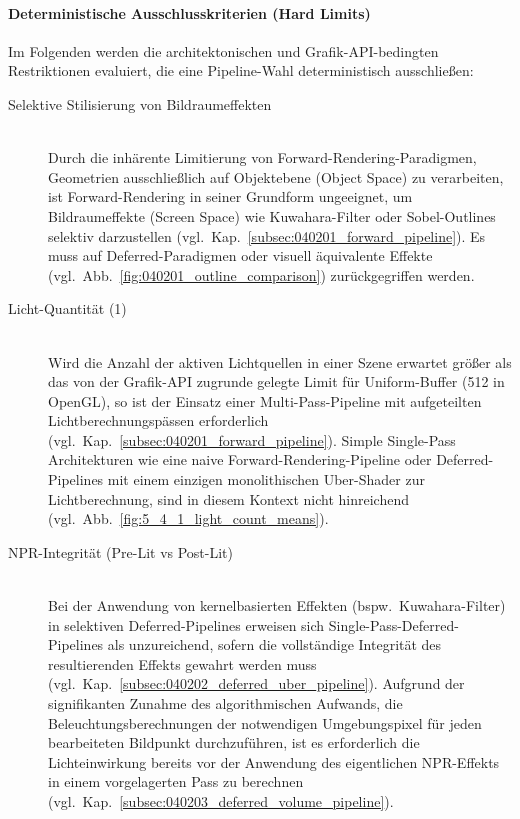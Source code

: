 \paragraph{Deterministische Ausschlusskriterien (Hard Limits)}
Im Folgenden werden die architektonischen und Grafik-\ac{API}-bedingten Restriktionen evaluiert, die eine Pipeline-Wahl
deterministisch ausschließen:

\begin{description}
    \item[Selektive Stilisierung von Bildraumeffekten] ~\\
    Durch die inhärente Limitierung von Forward-Rendering-Paradigmen, Geometrien ausschließlich
    auf Objektebene (Object Space) zu verarbeiten, ist Forward-Rendering in seiner Grundform ungeeignet, um
    Bildraumeffekte (Screen Space) wie Kuwahara-Filter oder Sobel-Outlines selektiv darzustellen
    (vgl.\ Kap.~\ref{subsec:040201_forward_pipeline}).
    Es muss auf Deferred-Paradigmen oder visuell äquivalente Effekte (vgl.\ Abb.~\ref{fig:040201_outline_comparison})
    zurückgegriffen werden.

    \item[Licht-Quantität (1)] ~\\
    Wird die Anzahl der aktiven Lichtquellen in einer Szene erwartet größer als das von der Grafik-\ac{API} zugrunde
    gelegte Limit für Uniform-Buffer (512 in OpenGL), so ist der Einsatz einer Multi-Pass-Pipeline mit aufgeteilten
    Lichtberechnungspässen erforderlich (vgl.\ Kap.~\ref{subsec:040201_forward_pipeline}).
    Simple Single-Pass Architekturen wie eine naive Forward-Rendering-Pipeline oder Deferred-Pipelines mit einem
    einzigen monolithischen Uber-Shader zur Lichtberechnung, sind in diesem Kontext nicht hinreichend
    (vgl.\ Abb.~\ref{fig:5_4_1_light_count_means}).

    \item[NPR-Integrität (Pre-Lit vs Post-Lit)] ~\\
    Bei der Anwendung von kernelbasierten Effekten (bspw.\ Kuwahara-Filter) in selektiven
    Deferred-Pipelines erweisen sich Single-Pass-Deferred-Pipelines als unzureichend, sofern die vollständige Integrität
    des resultierenden Effekts gewahrt werden muss (vgl.\ Kap.~\ref{subsec:040202_deferred_uber_pipeline}).
    Aufgrund der signifikanten Zunahme des algorithmischen Aufwands, die Beleuchtungsberechnungen
    der notwendigen Umgebungspixel für jeden bearbeiteten Bildpunkt durchzuführen, ist es erforderlich die
    Lichteinwirkung bereits vor der Anwendung des eigentlichen \ac{NPR}-Effekts in einem vorgelagerten Pass zu
    berechnen (vgl.\ Kap.~\ref{subsec:040203_deferred_volume_pipeline}).
\end{description}

